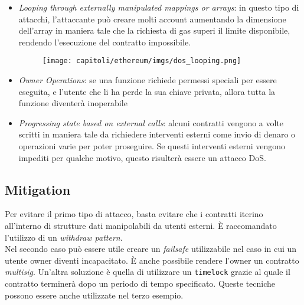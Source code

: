 \begin{itemize}
      \item \textit{Looping through externally manipulated mappings or arrays}:
            in questo tipo di attacchi, l'attaccante può creare molti account aumentando
            la dimensione dell'array in maniera tale che la richiesta di gas superi il
            limite disponibile, rendendo l'esecuzione del contratto impossibile.
            \begin{figure}[H]
                  \centering
                  \texttt{[image: capitoli/ethereum/imgs/dos\_looping.png]}
            \end{figure}
      \item \textit{Owner Operations}:
            se una funzione richiede permessi speciali per essere eseguita,
            e l'utente che li ha perde la sua chiave privata,
            allora tutta la funzione diventerà inoperabile
      \item \textit{Progressing state based on external calls}:
            alcuni contratti vengono a volte scritti in maniera tale da richiedere
            interventi esterni come invio di denaro o operazioni varie per poter
            proseguire. Se questi interventi esterni vengono impediti per qualche motivo,
            questo risulterà essere un attacco DoS.
\end{itemize}

\subsection{Mitigation}

Per evitare il primo tipo di attacco,
basta evitare che i contratti iterino all'interno di strutture dati manipolabili
da utenti esterni. È raccomandato l'utilizzo di un \textit{withdraw pattern}.\\

Nel secondo caso può essere utile creare un \textit{failsafe} utilizzabile nel
caso in cui un utente owner diventi incapacitato.
È anche possibile rendere l'owner un contratto \textit{multisig}.
Un'altra soluzione è quella di utilizzare un \verb|timelock| grazie al quale il
contratto terminerà dopo un periodo di tempo specificato.
Queste tecniche possono essere anche utilizzate nel terzo esempio.